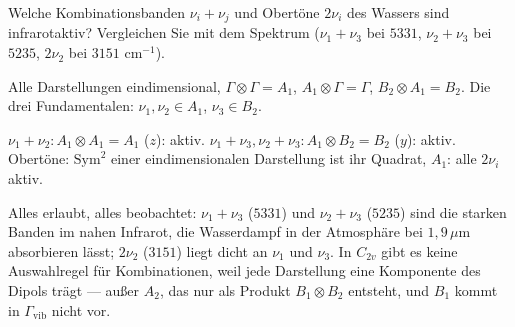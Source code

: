 \begin{aufgabe}
Welche Kombinationsbanden $\nu_i + \nu_j$ und Obertöne $2\nu_i$ des Wassers sind infrarotaktiv? Vergleichen Sie mit dem Spektrum ($\nu_1 + \nu_3$ bei $5331$, $\nu_2 + \nu_3$ bei $5235$, $2\nu_2$ bei $3151$ cm$^{-1}$).

\loesung
{}
Alle Darstellungen eindimensional, $\Gamma\otimes\Gamma = A_1$, $A_1\otimes\Gamma = \Gamma$, $B_2\otimes A_1 = B_2$. Die drei Fundamentalen: $\nu_1, \nu_2\in A_1$, $\nu_3\in B_2$.

$\nu_1 + \nu_2\colon A_1\otimes A_1 = A_1$ ($z$): aktiv. $\nu_1 + \nu_3, \nu_2 + \nu_3\colon A_1\otimes B_2 = B_2$ ($y$): aktiv. Obertöne: $\mathrm{Sym}^{2}$ einer eindimensionalen Darstellung ist ihr Quadrat, $A_1$: alle $2\nu_i$ aktiv.

Alles erlaubt, alles beobachtet: $\nu_1 + \nu_3$ ($5331$) und $\nu_2 + \nu_3$ ($5235$) sind die starken Banden im nahen Infrarot, die Wasserdampf in der Atmosphäre bei $1{,}9\,\mu$m absorbieren lässt; $2\nu_2$ ($3151$) liegt dicht an $\nu_1$ und $\nu_3$. In $C_{2v}$ gibt es keine Auswahlregel für Kombinationen, weil jede Darstellung eine Komponente des Dipols trägt --- außer $A_2$, das nur als Produkt $B_1\otimes B_2$ entsteht, und $B_1$ kommt in $\Gamma_{\mathrm{vib}}$ nicht vor.

\begin{center}
\begin{minipage}{0.88\textwidth}
\end{minipage}
\end{center}
\end{aufgabe}

